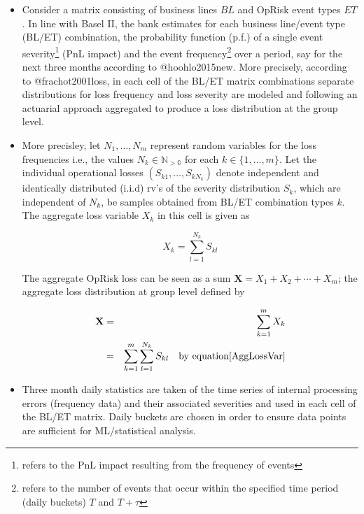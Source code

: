 \documentclass{DissertateUSU}
\begin{document}
\begin{itemize}
\item Consider a matrix consisting of business lines $BL$ and OpRisk event types $ET$. In line with Basel II, the bank estimates for each business line/event type (BL/ET) combination, the probability function (p.f.) of a single event severity\footnote{refers to the PnL impact resulting from the frequency of events} (PnL impact) and the event frequency\footnote{refers to the number of events that occur within the specified time period (daily buckets) $T$ and $T + \tau$} over a period, say for the next three months according to @hoohlo2015new. More precisely, according to @frachot2001loss, in each cell of the BL/ET matrix combinations separate distributions for loss frequency and loss severity are modeled and following an actuarial approach aggregated to produce a loss distribution at the group level.

\item More precisley, let $N_1,\ldots,N_m$ represent random variables for the loss frequencies i.e., the values $N_k \in \mathbb{N_{>0}}$ for each $k \in \{1,\ldots,m\}$. Let the individual operational losses \begin{math} (S_{k1}, \ldots, S_{kN_k})\end{math} denote independent and identically distributed (i.i.d) rv's of the severity distribution $S_k$, which are independent of $N_k$, be samples obtained from BL/ET combination types $k$. The aggregate loss variable $X_k$ in this cell is given as

\singlespacing
\begin{equation}\label{AggLossVar}
X_k = \sum_{l=1}^{N_k}S_{kl} 
\end{equation}
\doublespacing

The aggregate OpRisk loss can be seen as a sum $\mathbf{X} = X_1 + X_2 + \cdots + X_m$; the aggregate loss distribution at group level defined by

\singlespacing
\begin{eqnarray}\label{CombLossVar}
\mathbf{X} &=& \sum_{k=1}^m X_k \\
           &=& \sum_{k=1}^m \sum_{l=1}^{N_k}S_{kl} \quad \mbox{by equation} \ref{AggLossVar}
\end{eqnarray}
\doublespacing

\item Three month daily statistics are taken of the time series of internal processing errors (frequency data) and their associated severities and used in each cell of the BL/ET matrix. Daily buckets are chosen in order to ensure data points are sufficient for ML/statistical analysis.
\end{itemize}
\end{document}
